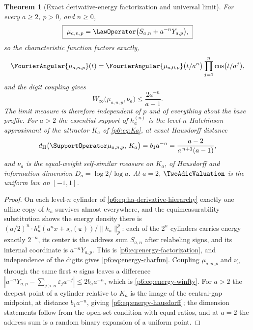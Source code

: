 \documentclass[11pt,oneside]{article}
\numberwithin{equation}{section}
\newtheorem{theorem}{Theorem}[section]
\theoremstyle{definition}
\theoremstyle{remark}
\begin{document}
\begin{theorem}[Exact derivative-energy factorization and universal limit]
\label{p6:thm:energy-factorization}
For every $a\ge2$, $p>0$, and $n\ge0$,
\begin{equation}\label{p6:eq:energy-factorization}
 \boxed{\ \mu_{a,n,p}=\LawOperator\bigl(S_{a,n}+a^{-n}Y_{a,p}\bigr),\ }
\end{equation}
so the characteristic function factors exactly,
\begin{equation}\label{p6:eq:energy-charfun}
 \FourierAngular{\mu_{a,n,p}}(t)
 =\FourierAngular{\mu_{a,0,p}}\bigl(t/a^{n}\bigr)
 \prod_{j=1}^{n}\cos\bigl(t/a^{j}\bigr),
\end{equation}
and the digit coupling gives
\begin{equation}\label{p6:eq:energy-winfty}
 W_\infty\bigl(\mu_{a,n,p},\nu_a\bigr)\le\frac{2a^{-n}}{a-1}.
\end{equation}
The limit measure is therefore independent of $p$ and of everything about
the base profile.  For $a>2$ the essential support of $h_a^{(n)}$ is the
level-$n$ Hutchinson approximant of the attractor $K_a$ of
\eqref{p6:eq:Ka}, at exact Hausdorff distance
\begin{equation}\label{p6:eq:energy-hausdorff}
 d_{\mathrm H}\bigl(\SupportOperator\mu_{a,n,p},\,K_a\bigr)
 =b_1a^{-n}
 =\frac{a-2}{a^{\,n+1}(a-1)},
\end{equation}
and $\nu_a$ is the equal-weight self-similar measure on $K_a$, of Hausdorff
and information dimension $D_a=\log2/\log a$.  At $a=2$, $\TwoAdicValuation$ is the
uniform law on $[-1,1]$.
\end{theorem}

\begin{proof}
On each level-$n$ cylinder of \eqref{p6:eq:ha-derivative-hierarchy} exactly
one affine copy of $h_a$ survives almost everywhere, and the
equimeasurability substitution shows the energy density there is
$(a/2)^n\cdot h_a^p(a^nx+s_a(\boldsymbol\varepsilon))/\|h_a\|_p^p$: each of
the $2^n$ cylinders carries energy exactly $2^{-n}$, its center is the
address sum $S_{a,n}$ after relabeling signs, and its internal coordinate is
$a^{-n}Y_{a,p}$.  This is \eqref{p6:eq:energy-factorization}, and
independence of the digits gives \eqref{p6:eq:energy-charfun}.  Coupling
$\mu_{a,n,p}$ and $\nu_a$ through the same first $n$ signs leaves a
difference $|a^{-n}Y_{a,p}-\sum_{j>n}\varepsilon_ja^{-j}|\le2b_aa^{-n}$,
which is \eqref{p6:eq:energy-winfty}.  For $a>2$ the deepest point of a
cylinder relative to $K_a$ is the image of the central-gap midpoint, at
distance $b_1a^{-n}$, giving \eqref{p6:eq:energy-hausdorff}; the dimension
statements follow from the open-set condition with equal ratios, and at
$a=2$ the address sum is a random binary expansion of a uniform point.
\end{proof}
\end{document}
